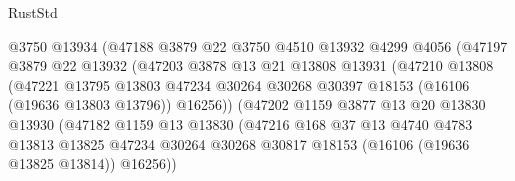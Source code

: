 \begin{lexlean}{RustStd}
\begin{coremodule}
                              @3750
                              @13934
                              (@47188
                                @3879
                                @22
                                @3750
                                @4510
                                @13932
                                @4299
                                @4056
                                (@47197
                                  @3879
                                  @22
                                  @13932
                                  (@47203
                                    @3878
                                    @13
                                    @21
                                    @13808
                                    @13931
                                    (@47210
                                      @13808
                                      (@47221
                                        @13795
                                        @13803
                                        @47234
                                        @30264
                                        @30268
                                        @30397
                                        @18153
                                        (@16106 (@19636 @13803 @13796))
                                        @16256))
                                    (@47202
                                      @1159
                                      @3877
                                      @13
                                      @20
                                      @13830
                                      @13930
                                      (@47182
                                        @1159
                                        @13
                                        @13830
                                        (@47216
                                          @168
                                          @37
                                          @13
                                          @4740
                                          @4783
                                          @13813
                                          @13825
                                          @47234
                                          @30264
                                          @30268
                                          @30817
                                          @18153
                                          (@16106 (@19636 @13825 @13814))
                                          @16256))

\end{coremodule}
\end{lexlean}
